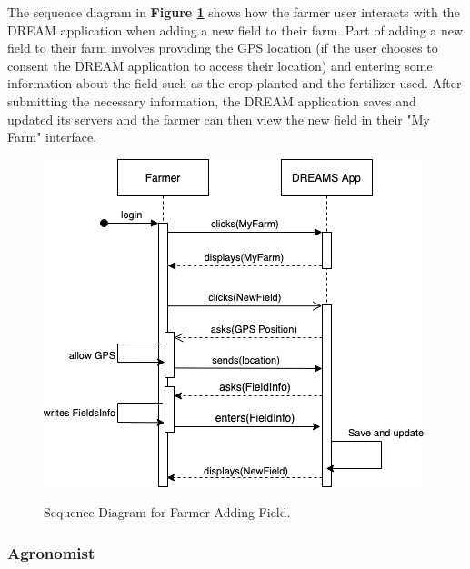 \begin{flushleft}
The sequence diagram in \textbf{Figure \ref{fig:farmerSeqNewField}} shows how the farmer user interacts with the DREAM application when adding a new field to their farm. Part of adding a new field to their farm involves providing the GPS location (if the user chooses to consent the DREAM application to access their location) and entering some information about the field such as the crop planted and the fertilizer used. After submitting the necessary information, the DREAM application saves and updated its servers and the farmer can then view the new field in their "My Farm" interface.
\end{flushleft}

\begin{figure}[htb!]
\centering
\includegraphics[scale=0.6]{Files/sequence_disgrams/thePNGs/farmer_newField.png}\\
\caption{\label{fig:farmerSeqNewField}Sequence Diagram for Farmer Adding Field.}
\end{figure}

\newpage
\subsubsection{Agronomist}

